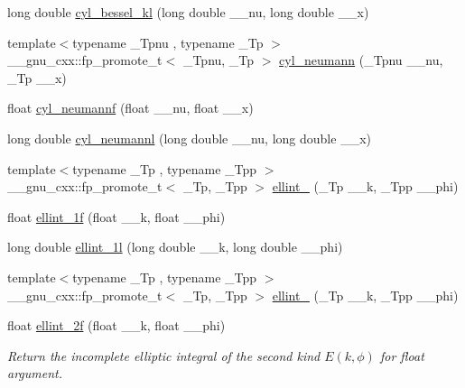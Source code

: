 \begin{DoxyCompactItemize}
\item 
long double \hyperlink{group__cxx17__math__spec__func_gac35194b926270d7857d651e06198c7d3}{cyl\+\_\+bessel\+\_\+kl} (long double \+\_\+\+\_\+nu, long double \+\_\+\+\_\+x)
\item 
{\footnotesize template$<$typename \+\_\+\+Tpnu , typename \+\_\+\+Tp $>$ }\\\+\_\+\+\_\+gnu\+\_\+cxx\+::fp\+\_\+promote\+\_\+t$<$ \+\_\+\+Tpnu, \+\_\+\+Tp $>$ \hyperlink{group__cxx17__math__spec__func_ga1e4bef23704469b0704cf15c5f04e29e}{cyl\+\_\+neumann} (\+\_\+\+Tpnu \+\_\+\+\_\+nu, \+\_\+\+Tp \+\_\+\+\_\+x)
\item 
float \hyperlink{group__cxx17__math__spec__func_ga604c13e8f2bb7cd3c7c91d8b19d6b13a}{cyl\+\_\+neumannf} (float \+\_\+\+\_\+nu, float \+\_\+\+\_\+x)
\item 
long double \hyperlink{group__cxx17__math__spec__func_gaf8986bae9a523c48d861d233835bda8f}{cyl\+\_\+neumannl} (long double \+\_\+\+\_\+nu, long double \+\_\+\+\_\+x)
\item 
{\footnotesize template$<$typename \+\_\+\+Tp , typename \+\_\+\+Tpp $>$ }\\\+\_\+\+\_\+gnu\+\_\+cxx\+::fp\+\_\+promote\+\_\+t$<$ \+\_\+\+Tp, \+\_\+\+Tpp $>$ \hyperlink{group__cxx17__math__spec__func_ga1550d6947bbbeee9865aabd398102a36}{ellint\+\_} (\+\_\+\+Tp \+\_\+\+\_\+k, \+\_\+\+Tpp \+\_\+\+\_\+phi)
\item 
float \hyperlink{group__cxx17__math__spec__func_ga308d23d70f4b5e848eb7a4173628ef3b}{ellint\+\_\+1f} (float \+\_\+\+\_\+k, float \+\_\+\+\_\+phi)
\item 
long double \hyperlink{group__cxx17__math__spec__func_ga795383fa51e02351000b410b478d824f}{ellint\+\_\+1l} (long double \+\_\+\+\_\+k, long double \+\_\+\+\_\+phi)
\item 
{\footnotesize template$<$typename \+\_\+\+Tp , typename \+\_\+\+Tpp $>$ }\\\+\_\+\+\_\+gnu\+\_\+cxx\+::fp\+\_\+promote\+\_\+t$<$ \+\_\+\+Tp, \+\_\+\+Tpp $>$ \hyperlink{group__cxx17__math__spec__func_gad64cb9babb7837d585912b1a94b2cb7d}{ellint\+\_} (\+\_\+\+Tp \+\_\+\+\_\+k, \+\_\+\+Tpp \+\_\+\+\_\+phi)
\item 
float \hyperlink{group__cxx17__math__spec__func_ga594a730163c6228c75b152462700062b}{ellint\+\_\+2f} (float \+\_\+\+\_\+k, float \+\_\+\+\_\+phi)
\begin{DoxyCompactList}\small\item\em Return the incomplete elliptic integral of the second kind $ E(k,\phi) $ for {\ttfamily float} argument. \end{DoxyCompactList}\item 

\end{DoxyCompactItemize}
